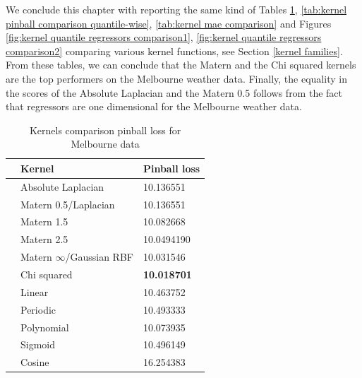 We conclude this chapter with reporting the same kind of Tables \ref{tab:kernel pinball comparison}, \ref{tab:kernel pinball comparison quantile-wise}, \ref{tab:kernel mae comparison} and Figures \ref{fig:kernel quantile regressors comparison1}, \ref{fig:kernel quantile regressors comparison2} comparing various kernel functions, see Section \ref{kernel families}.
From these tables, we can conclude that the Matern and the Chi squared kernels are the top performers on the Melbourne weather data. Finally, the equality in the scores of the Absolute Laplacian and the Matern 0.5 follows from the fact that regressors are one dimensional for the Melbourne weather data.
\begin{table}[!htp]
    \caption{Kernels comparison pinball loss for Melbourne data}
    \label{tab:kernel pinball comparison}
    \begin{center}
    \begin{tabular}{lll}
        \toprule
        & Kernel & Pinball loss
        \\
        \midrule
        & Absolute Laplacian &  10.136551 \\
        & Matern 0.5/Laplacian & 10.136551  \\
        & Matern 1.5 & 10.082668  \\
        & Matern 2.5 & 10.0494190    \\

        & Matern $\infty$/Gaussian RBF &  10.031546 \\

        & Chi squared & \textbf{10.018701}       \\
        
        & Linear & 10.463752    \\
        & Periodic  & 10.493333\\
        & Polynomial & 10.073935     \\
        & Sigmoid & 10.496149            \\
        & Cosine & 16.254383    \\
        \bottomrule
        \end{tabular}
    \end{center}
    \end{table}
    
